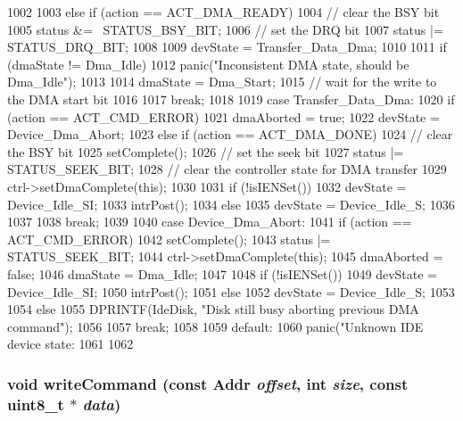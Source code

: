 \begin{DoxyCode}
{{{{1002             }
1003         } else if (action == ACT_DMA_READY) {
1004             // clear the BSY bit
1005             status &= ~STATUS_BSY_BIT;
1006             // set the DRQ bit
1007             status |= STATUS_DRQ_BIT;
1008 
1009             devState = Transfer_Data_Dma;
1010 
1011             if (dmaState != Dma_Idle)
1012                 panic("Inconsistent DMA state, should be Dma_Idle\n");
1013 
1014             dmaState = Dma_Start;
1015             // wait for the write to the DMA start bit
1016         }
1017         break;
1018 
1019       case Transfer_Data_Dma:
1020         if (action == ACT_CMD_ERROR) {
1021             dmaAborted = true;
1022             devState = Device_Dma_Abort;
1023         } else if (action == ACT_DMA_DONE) {
1024             // clear the BSY bit
1025             setComplete();
1026             // set the seek bit
1027             status |= STATUS_SEEK_BIT;
1028             // clear the controller state for DMA transfer
1029             ctrl->setDmaComplete(this);
1030 
1031             if (!isIENSet()) {
1032                 devState = Device_Idle_SI;
1033                 intrPost();
1034             } else {
1035                 devState = Device_Idle_S;
1036             }
1037         }
1038         break;
1039 
1040       case Device_Dma_Abort:
1041         if (action == ACT_CMD_ERROR) {
1042             setComplete();
1043             status |= STATUS_SEEK_BIT;
1044             ctrl->setDmaComplete(this);
1045             dmaAborted = false;
1046             dmaState = Dma_Idle;
1047 
1048             if (!isIENSet()) {
1049                 devState = Device_Idle_SI;
1050                 intrPost();
1051             } else {
1052                 devState = Device_Idle_S;
1053             }
1054         } else {
1055             DPRINTF(IdeDisk, "Disk still busy aborting previous DMA command\n");
1056         }
1057         break;
1058 
1059       default:
1060         panic("Unknown IDE device state: %
1061     }
1062 }
\end{DoxyCode}
\hypertarget{classIdeDisk_af940c7b6408a2bb34bdd3580e8415da6}{
\subsubsection[{writeCommand}]{\setlength{\rightskip}{0pt plus 5cm}void writeCommand (const {\bf Addr} {\em offset}, \/  int {\em size}, \/  const uint8\_\-t $\ast$ {\em data})}}
\label{classIdeDisk_af940c7b6408a2bb34bdd3580e8415da6}



